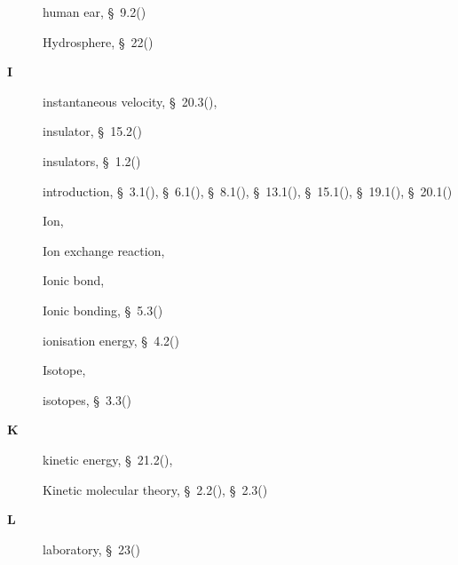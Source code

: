 \begin{multicols}{2}
{\begin{description}
	  \item[] \noindent\raggedright human ear,  \S~9.2(\pageref{m38800})
	  
	  \item[] \noindent\raggedright Hydrosphere,  \S~22(\pageref{m38138})
	  \vspace{.3cm}
	  \item[{\large \bfseries I}]\noindent\raggedright
	  instantaneous velocity,  \S~20.3(\pageref{m38791}),  \pageref{id2528795}
	  
	  \item[] \noindent\raggedright insulator,  \S~15.2(\pageref{m38781})
	  
	  \item[] \noindent\raggedright insulators,  \S~1.2(\pageref{m38706})
	  
	  \item[] \noindent\raggedright introduction,  \S~3.1(\pageref{m38756}),  \S~6.1(\pageref{m38801}),  \S~8.1(\pageref{m38782}),  \S~13.1(\pageref{m38721}),  \S~15.1(\pageref{m38780}),  \S~19.1(\pageref{m38812}),  \S~20.1(\pageref{m38787})
	  
	  \item[] \noindent\raggedright Ion,  \pageref{id2424842}
	  
	  \item[] \noindent\raggedright Ion exchange reaction,  \pageref{id2492977}
	  
	  \item[] \noindent\raggedright Ionic bond,  \pageref{id2430088}
	  
	  \item[] \noindent\raggedright Ionic bonding,  \S~5.3(\pageref{m38684})
	  
	  \item[] \noindent\raggedright ionisation energy,  \S~4.2(\pageref{m38757})
	  
	  \item[] \noindent\raggedright Isotope,  \pageref{id2417667}
	  
	  \item[] \noindent\raggedright isotopes,  \S~3.3(\pageref{m38753})
	  \vspace{.3cm}
	  \item[{\large \bfseries K}]\noindent\raggedright
	  kinetic energy,  \S~21.2(\pageref{m38785}),  \pageref{id2553759}
	  
	  \item[] \noindent\raggedright Kinetic molecular theory,  \S~2.2(\pageref{m38734}),  \S~2.3(\pageref{m38730})
	  \vspace{.3cm}
	  \item[{\large \bfseries L}]\noindent\raggedright
	  laboratory,  \S~23(\pageref{m38491})
	  

\end{description}}
\end{multicols}
